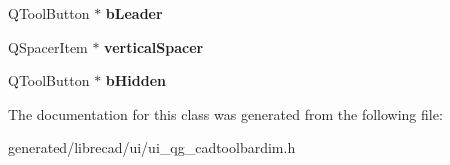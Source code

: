\begin{DoxyCompactItemize}
\item 
\hypertarget{classUi__QG__CadToolBarDim_a892b6ba5d91b0e79d9d6a182fa968559}{Q\-Tool\-Button $\ast$ {\bfseries b\-Leader}}\label{classUi__QG__CadToolBarDim_a892b6ba5d91b0e79d9d6a182fa968559}

\item 
\hypertarget{classUi__QG__CadToolBarDim_a72774160aaa1e4680a92a157e1b499fa}{Q\-Spacer\-Item $\ast$ {\bfseries vertical\-Spacer}}\label{classUi__QG__CadToolBarDim_a72774160aaa1e4680a92a157e1b499fa}

\item 
\hypertarget{classUi__QG__CadToolBarDim_a8ac1163cc6e0505de5f3f2295fdeadea}{Q\-Tool\-Button $\ast$ {\bfseries b\-Hidden}}\label{classUi__QG__CadToolBarDim_a8ac1163cc6e0505de5f3f2295fdeadea}

\end{DoxyCompactItemize}


The documentation for this class was generated from the following file\-:\begin{DoxyCompactItemize}
\item 
generated/librecad/ui/ui\-\_\-qg\-\_\-cadtoolbardim.\-h\end{DoxyCompactItemize}
